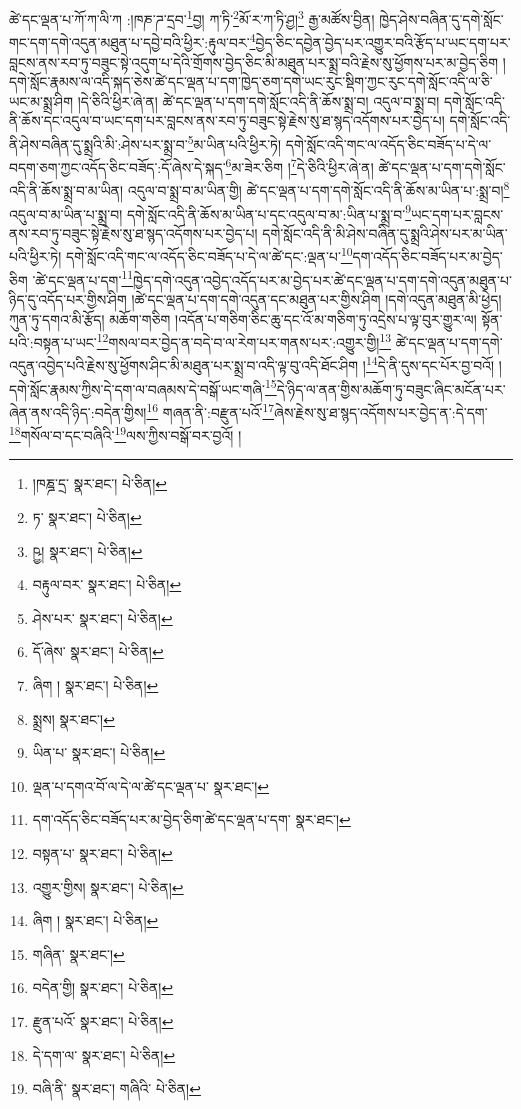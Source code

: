 ཚེ་དང་ལྡན་པ་ཀོ་ཀ་ལི་ཀ :།ཁཎ་ཌ་དྲབ་\footnote{།ཁཎྜ་དྲ་  སྣར་ཐང་།  པེ་ཅིན། }བྱ། ཀ་ཏི་\footnote{ཏ་  སྣར་ཐང་།  པེ་ཅིན། }མོ་ར་ཀ་ཏི་ཤྱ།\footnote{ཥྱ།  སྣར་ཐང་།  པེ་ཅིན། } རྒྱ་མཚོས་བྱིན། ཁྱེད་ཤེས་བཞིན་དུ་དགེ་སློང་གང་དག་དགེ་འདུན་མཐུན་པ་དབྱེ་བའི་ཕྱིར་:རྟུལ་བར་\footnote{བརྟུལ་བར་  སྣར་ཐང་།  པེ་ཅིན། }བྱེད་ཅིང་དབྱེན་བྱེད་པར་འགྱུར་བའི་རྩོད་པ་ཡང་དག་པར་བླངས་ནས་རབ་ཏུ་བཟུང་སྟེ་འདུག་པ་དེའི་གྲོགས་བྱེད་ཅིང་མི་མཐུན་པར་སྨྲ་བའི་རྗེས་སུ་ཕྱོགས་པར་མ་བྱེད་ཅིག །དགེ་སློང་རྣམས་ལ་འདི་སྐད་ཅེས་ཚེ་དང་ལྡན་པ་དག་ཁྱེད་ཅག་དགེ་ཡང་རུང་སྡིག་ཀྱང་རུང་དགེ་སློང་འདི་ལ་ཅི་ཡང་མ་སྨྲ་ཤིག །དེ་ཅིའི་ཕྱིར་ཞེ་ན། ཚེ་དང་ལྡན་པ་དག་དགེ་སློང་འདི་ནི་ཆོས་སྨྲ་བ། འདུལ་བ་སྨྲ་བ། དགེ་སློང་འདི་ནི་ཆོས་དང་འདུལ་བ་ཡང་དག་པར་བླངས་ནས་རབ་ཏུ་བཟུང་སྟེ་རྗེས་སུ་ཐ་སྙད་འདོགས་པར་བྱེད་པ། དགེ་སློང་འདི་ནི་ཤེས་བཞིན་དུ་སྨྲའི་མི་:ཤེས་པར་སྨྲ་བ་\footnote{ཤེས་པར་  སྣར་ཐང་།  པེ་ཅིན། }མ་ཡིན་པའི་ཕྱིར་ཏེ། དགེ་སློང་འདི་གང་ལ་འདོད་ཅིང་བཟོད་པ་དེ་ལ་བདག་ཅག་ཀྱང་འདོད་ཅིང་བཟོད་:དོ་ཞེས་དེ་སྐད་\footnote{དོ་ཞེས་  སྣར་ཐང་།  པེ་ཅིན། }མ་ཟེར་ཅིག །\footnote{ཞིག །  སྣར་ཐང་།  པེ་ཅིན། }དེ་ཅིའི་ཕྱིར་ཞེ་ན། ཚེ་དང་ལྡན་པ་དག་དགེ་སློང་འདི་ནི་ཆོས་སྨྲ་བ་མ་ཡིན། འདུལ་བ་སྨྲ་བ་མ་ཡིན་གྱི། ཚེ་དང་ལྡན་པ་དག་དགེ་སློང་འདི་ནི་ཆོས་མ་ཡིན་པ་:སྨྲ་བ།\footnote{སྨྲས།  སྣར་ཐང་། } འདུལ་བ་མ་ཡིན་པ་སྨྲ་བ། དགེ་སློང་འདི་ནི་ཆོས་མ་ཡིན་པ་དང་འདུལ་བ་མ་:ཡིན་པ་སྨྲ་བ་\footnote{ཡིན་པ་  སྣར་ཐང་།  པེ་ཅིན། }ཡང་དག་པར་བླངས་ནས་རབ་ཏུ་བཟུང་སྟེ་རྗེས་སུ་ཐ་སྙད་འདོགས་པར་བྱེད་པ། དགེ་སློང་འདི་ནི་མི་ཤེས་བཞིན་དུ་སྨྲའི་ཤེས་པར་མ་ཡིན་པའི་ཕྱིར་ཏེ། དགེ་སློང་འདི་གང་ལ་འདོད་ཅིང་བཟོད་པ་དེ་ལ་ཚེ་དང་:ལྡན་པ་\footnote{ལྡན་པ་དགའ་བོ་ལ་དེ་ལ་ཚེ་དང་ལྡན་པ་  སྣར་ཐང་། }དག་འདོད་ཅིང་བཟོད་པར་མ་བྱེད་ཅིག ་ཚེ་དང་ལྡན་པ་དག་\footnote{དག་འདོད་ཅིང་བཟོད་པར་མ་བྱེད་ཅིག་ཚེ་དང་ལྡན་པ་དག་  སྣར་ཐང་། }ཁྱེད་དགེ་འདུན་འབྱེད་འདོད་པར་མ་བྱེད་པར་ཚེ་དང་ལྡན་པ་དག་དགེ་འདུན་མཐུན་པ་ཉིད་དུ་འདོད་པར་གྱིས་ཤིག །ཚེ་དང་ལྡན་པ་དག་དགེ་འདུན་དང་མཐུན་པར་གྱིས་ཤིག །དགེ་འདུན་མཐུན་མི་ཕྱེད། ཀུན་ཏུ་དགའ་མི་རྩོད། མཆོག་གཅིག །འདོན་པ་གཅིག་ཅིང་ཆུ་དང་འོ་མ་གཅིག་ཏུ་འདྲེས་པ་ལྟ་བུར་གྱུར་ལ། སྟོན་པའི་:བསྟན་པ་ཡང་\footnote{བསྟན་པ་  སྣར་ཐང་།  པེ་ཅིན། }གསལ་བར་བྱེད་ན་བདེ་བ་ལ་རེག་པར་གནས་པར་:འགྱུར་གྱི།\footnote{འགྱུར་གྱིས།  སྣར་ཐང་།  པེ་ཅིན། } ཚེ་དང་ལྡན་པ་དག་དགེ་འདུན་འབྱེད་པའི་རྗེས་སུ་ཕྱོགས་ཤིང་མི་མཐུན་པར་སྨྲ་བ་འདི་ལྟ་བུ་འདི་ཐོང་ཤིག །\footnote{ཞིག །  སྣར་ཐང་།  པེ་ཅིན། }དེ་ནི་དུས་དང་པོར་བྱ་བའོ། །དགེ་སློང་རྣམས་ཀྱིས་དེ་དག་ལ་བཞམས་དེ་བསྒོ་ཡང་གཞི་\footnote{གཞིན་  སྣར་ཐང་། }དེ་ཉིད་ལ་ནན་གྱིས་མཆོག་ཏུ་བཟུང་ཞིང་མངོན་པར་ཞེན་ནས་འདི་ཉིད་:བདེན་གྱིས།\footnote{བདེན་གྱི།  སྣར་ཐང་།  པེ་ཅིན། } གཞན་ནི་:བརྫུན་པའོ་\footnote{རྫུན་པའོ་  སྣར་ཐང་།  པེ་ཅིན། }ཞེས་རྗེས་སུ་ཐ་སྙད་འདོགས་པར་བྱེད་ན་:དེ་དག་\footnote{དེ་དག་ལ་  སྣར་ཐང་།  པེ་ཅིན། }གསོལ་བ་དང་བཞིའི་\footnote{བཞི་ནི་  སྣར་ཐང་། གཞིའི་  པེ་ཅིན། }ལས་ཀྱིས་བསྒོ་བར་བྱའོ། །
